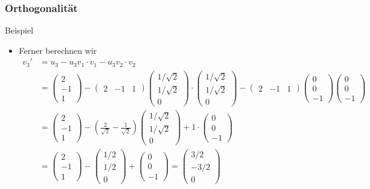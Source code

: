 \documentclass{beamer}
\newcommand\bc[1]{\left({#1}\right)}
\renewcommand{\ae}{\"a}
\newcommand{\mytitle}{Orthogonalit\ae t}
\begin{document}
\begin{frame}\frametitle{\mytitle}
	\begin{block}{Beispiel}
		\begin{itemize}
			\item Ferner berechnen wir
				\begin{align*}
					v_3'&=u_3-u_3v_1\cdot v_1-u_3v_2\cdot v_2\\
						&=\begin{pmatrix} 2\\-1\\1 \end{pmatrix}-
					\begin{pmatrix} 2&-1&1 \end{pmatrix}\begin{pmatrix}1/\sqrt 2\\1/\sqrt 2\\0\end{pmatrix}\cdot\begin{pmatrix}1/\sqrt 2\\1/\sqrt 2\\0\end{pmatrix}-\begin{pmatrix} 2&-1&1 \end{pmatrix}\begin{pmatrix}0\\0\\-1\end{pmatrix}\begin{pmatrix}0\\0\\-1\end{pmatrix}\\
									 &=\begin{pmatrix} 2\\-1\\1 \end{pmatrix}-\bc{\frac{2}{\sqrt 2}-\frac{1}{\sqrt 2}}\begin{pmatrix}1/\sqrt 2\\1/\sqrt 2\\0\end{pmatrix}+1\cdot\begin{pmatrix}0\\0\\-1\end{pmatrix}\\
									 &=\begin{pmatrix} 2\\-1\\1 \end{pmatrix}-\begin{pmatrix}1/2\\1/2\\0\end{pmatrix}+\begin{pmatrix}0\\0\\-1\end{pmatrix}=\begin{pmatrix}3/2\\-3/2\\0\end{pmatrix}

\end{align*}
\end{itemize}
\end{block}
\end{frame}
\end{document}
